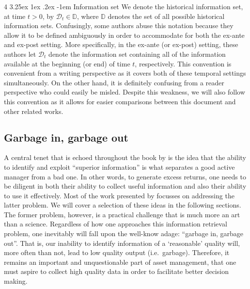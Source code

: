\documentclass[12pt]{article}
\makeatletter
\renewcommand\paragraph{%
	\@startsection{paragraph}
	{4}
	{\z@}
	{3.25ex \@plus1ex \@minus.2ex}
	{-1em}
	{\normalfont\normalsize\bfseries\maybe@addperiod}%
}
\newcommand{\maybe@addperiod}[1]{%
	#1\@addpunct{.}%
}
\makeatother
\begin{document}
\paragraph{Information set} We denote the historical information set, at time $t > 0$, by $\mathcal{D}_t \in \mathbb{D}$, where $\mathbb{D}$ denotes the set of all possible historical information sets. Confusingly, some authors abuse this notation because they allow it to be defined ambiguously in order to accommodate for both the ex-ante and ex-post setting. More specifically, in the ex-ante (or ex-post) setting, these authors let $\mathcal{D}_t$ denote the information set containing all of the information available at the beginning (or end) of time $t$, respectively. This convention is convenient from a writing perspective as it covers both of these temporal settings simultaneously. On the other hand, it is definitely confusing from a reader perspective who could easily be misled. Despite this weakness, we will also follow this convention as it allows for easier comparisons between this document and other related works.

\subsection{Garbage in, garbage out}
A central tenet that is echoed throughout the book by \cite{grinold1999} is the idea that the ability to identify and exploit ``superior information'' is what separates a good active manager from a bad one. In other words, to generate excess returns, one needs to be diligent in both their ability to collect useful information and also their ability to use it effectively. Most of the work presented by \cite{grinold1999} focusses on addressing the latter problem. We will cover a selection of these ideas in the following sections. The former problem, however, is a practical challenge that is much more an art than a science. Regardless of how one approaches this information retrieval problem, one inevitably will fall upon the well-know adage: ``garbage in, garbage out''. That is, our inability to identify information of a `reasonable' quality will, more often than not, lead to low quality output (i.e.\ garbage). Therefore, it remains an important and unquestionable part of asset management, that one must aspire to collect high quality data in order to facilitate better decision making.

\end{document}
